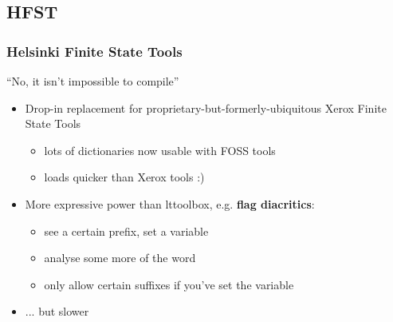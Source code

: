 \documentclass[notes=hide]{beamer}
\begin{document}
\subsection{HFST}
\begin{frame}\frametitle{Helsinki Finite State Tools}
  \begin{center}
    ``No, it isn't impossible to compile''
  \end{center}
  \begin{itemize}
  \item Drop-in replacement for proprietary-but-formerly-ubiquitous
    Xerox Finite State Tools
    \begin{itemize}
    \item lots of dictionaries now usable with FOSS tools
    \item loads quicker than Xerox tools :)
    \end{itemize}
  \end{itemize}

  \begin{itemize}
  \item More expressive power than lttoolbox, e.g. \textbf{flag
      diacritics}:
    \begin{itemize}
    \item see a certain prefix, set a variable
    \item analyse some more of the word
    \item only allow certain suffixes if you've set the variable
    \end{itemize}
  \item ... but slower          %
  \end{itemize}
\end{frame}
\end{document}
